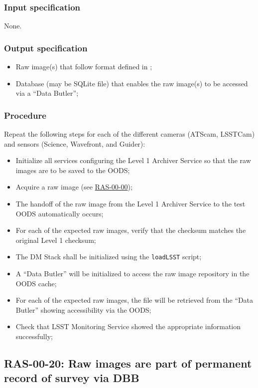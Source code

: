 \documentclass[DM,lsstdraft,STS,toc]{lsstdoc}
\begin{document}
\subsubsection{Input specification}


None.


\subsubsection{Output specification}
\begin{itemize}
\item{Raw image(s) that follow format defined in ;}
\item{Database (may be SQLite file) that enables the raw image(s) to be accessed via a ``Data Butler'';}
\end{itemize}


\subsubsection{Procedure}
Repeat the following steps for each of the different cameras (ATScam, LSSTCam) and sensors (Science, Wavefront, and Guider):
\begin{itemize}
\item{Initialize all services configuring the Level 1 Archiver Service so that the raw images are to be saved to the OODS;}
\item{Acquire a raw image (see \hyperref[ras-00-00]{RAS-00-00});}
\item{The handoff of the raw image from the Level 1 Archiver Service to the test OODS automatically occurs;}
\item{For each of the expected raw images, verify that the checksum matches the original Level 1 checksum;}
\item{The DM Stack shall be initialized using the \texttt{loadLSST} script;}
\item{A ``Data Butler'' will be initialized to access the raw image repository in the OODS cache;}
\item{For each of the expected raw images, the file will be retrieved from the ``Data Butler'' showing accessibility via the OODS;}
\item{Check that LSST Monitoring Service showed the appropriate information successfully;}
\end{itemize}




\subsection{RAS-00-20: Raw images are part of permanent record of survey via DBB}
\label{ras-00-20}
\end{document}
